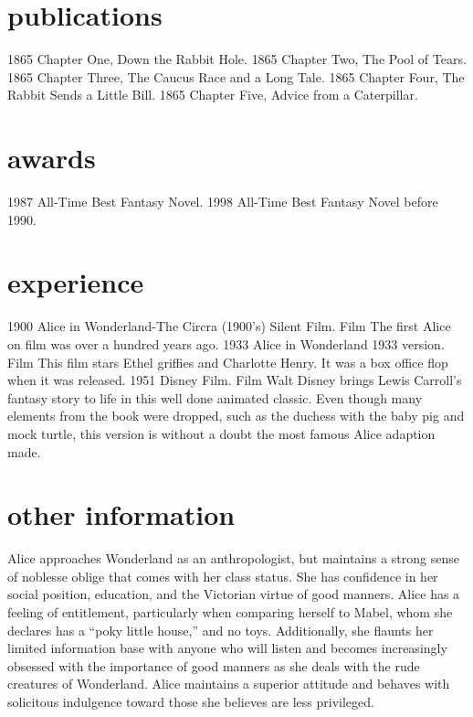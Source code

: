 \documentclass[]{twentysecondcv}
\begin{document}
\section{publications}
\begin{twentyshort}
  \twentyitemshort
    {1865}
    {Chapter One, Down the Rabbit Hole.}
  \twentyitemshort
    {1865}
    {Chapter Two, The Pool of Tears.}
  \twentyitemshort
    {1865}
    {Chapter Three,  The Caucus Race and a Long Tale.}
  \twentyitemshort
    {1865}
    {Chapter Four,  The Rabbit Sends a Little Bill.}
  \twentyitemshort
    {1865}
    {Chapter Five,  Advice from a Caterpillar.}
\end{twentyshort}

\section{awards}
\begin{twentyshort}
  \twentyitemshort
    {1987}
    {All-Time Best Fantasy Novel.}
  \twentyitemshort
    {1998}
    {All-Time Best Fantasy Novel before 1990.}
\end{twentyshort}

\section{experience}
\begin{twenty}
  \twentyitem
    {1900}
    {Alice in Wonderland-The Circra (1900's) Silent Film.}
    {Film}
    {The first Alice on film was over a hundred years ago.}
  \twentyitem
    {1933}
    {Alice in Wonderland 1933 version.}
    {Film}
    {This film stars Ethel griffies and Charlotte Henry. It was a box office flop when it was released.}
\twentyitem
    {1951}
    {Disney Film.}
    {Film}
    {Walt Disney brings Lewis Carroll's fantasy story to life in this well done animated classic. Even though many elements from the book were dropped, such as the duchess with the baby pig and mock turtle, this version is without a doubt the most famous Alice adaption made.}

\end{twenty}
\section{other information}
Alice approaches Wonderland as an anthropologist, but maintains a strong sense of noblesse oblige that comes with her class status. She has confidence in her social position, education, and the Victorian virtue of good manners. Alice has a feeling of entitlement, particularly when comparing herself to Mabel, whom she declares has a “poky little house,” and no toys. Additionally, she flaunts her limited information base with anyone who will listen and becomes increasingly obsessed with the importance of good manners as she deals with the rude creatures of Wonderland. Alice maintains a superior attitude and behaves with solicitous indulgence toward those she believes are less privileged.

\end{document}
